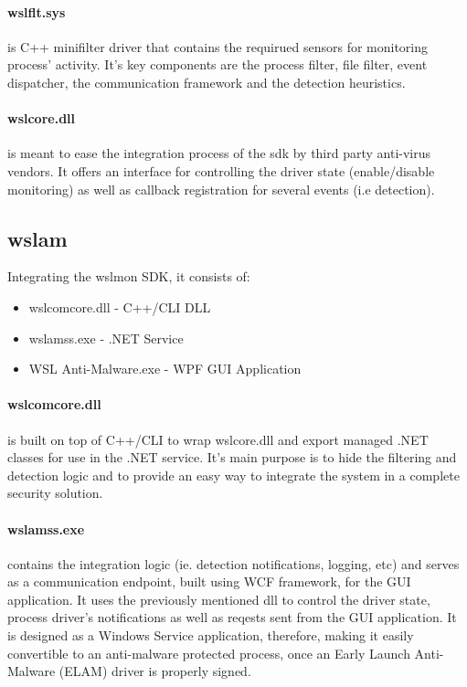        \paragraph{wslflt.sys}
        is C++ minifilter driver that contains the requirued sensors for monitoring process' activity. It's key components are the
        process filter, file filter, event dispatcher, the communication framework and the detection heuristics.

        \paragraph{wslcore.dll}
        is meant to ease the integration process of the sdk by third party anti-virus vendors. It offers an interface for controlling the driver
        state (enable/disable monitoring) as well as callback registration for several events (i.e detection).

    \subsection{wslam}
        Integrating the wslmon SDK, it consists of:
        
        \begin{itemize}
            \item wslcomcore.dll - C++/CLI DLL
            \item wslamss.exe - .NET Service
            \item WSL Anti-Malware.exe - WPF GUI Application
        \end{itemize}

        \paragraph{wslcomcore.dll} is built on top of C++/CLI to wrap wslcore.dll and export managed .NET classes
        for use in the .NET service. It's main purpose is to hide the filtering and detection logic and to provide an easy way to integrate
        the system in a complete security solution.

        \paragraph{wslamss.exe} contains the integration logic (ie. detection notifications, logging, etc) and serves as a communication
        endpoint, built using WCF framework, for the GUI application. It uses the previously mentioned dll to control the driver state, process
        driver's notifications as well as reqests sent from the GUI application. It is designed as a Windows Service application, therefore,
        making it easily convertible to an anti-malware protected process, once an Early Launch Anti-Malware (ELAM) driver is properly signed.

